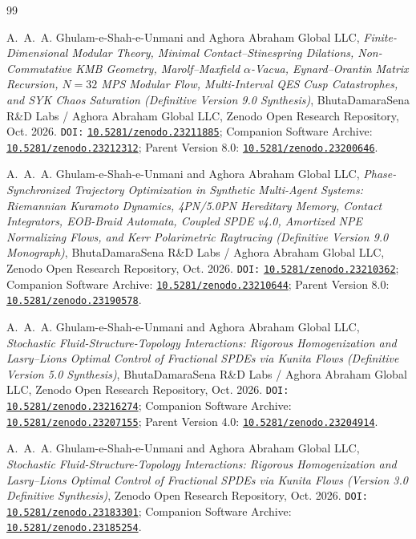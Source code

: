 \documentclass[11pt,a4paper,reqno]{article}
\newcommand{\zenodo}[1]{\href{https://doi.org/10.5281/zenodo.#1}{\nolinkurl{10.5281/zenodo.#1}}}
\theoremstyle{plain}
\theoremstyle{definition}
\theoremstyle{remark}
\numberwithin{equation}{section}
\begin{document}
\clearpage
\begin{thebibliography}{99}

A.~A.~A. Ghulam-e-Shah-e-Unmani and {Aghora Abraham Global LLC},
\emph{Finite-Dimensional Modular Theory, Minimal Contact--Stinespring Dilations, Non-Commutative KMB Geometry, Marolf--Maxfield $\alpha$-Vacua, Eynard--Orantin Matrix Recursion, $N=32$ MPS Modular Flow, Multi-Interval QES Cusp Catastrophes, and SYK Chaos Saturation (Definitive Version 9.0 Synthesis)},
BhutaDamaraSena R\&D Labs / Aghora Abraham Global LLC, Zenodo Open Research Repository, Oct. 2026.
\texttt{DOI:} \zenodo{23211885}; Companion Software Archive: \zenodo{23212312}; Parent Version 8.0: \zenodo{23200646}.

A.~A.~A. Ghulam-e-Shah-e-Unmani and {Aghora Abraham Global LLC},
\emph{Phase-Synchronized Trajectory Optimization in Synthetic Multi-Agent Systems: Riemannian Kuramoto Dynamics, 4PN/5.0PN Hereditary Memory, Contact Integrators, EOB-Braid Automata, Coupled SPDE v4.0, Amortized NPE Normalizing Flows, and Kerr Polarimetric Raytracing (Definitive Version 9.0 Monograph)},
BhutaDamaraSena R\&D Labs / Aghora Abraham Global LLC, Zenodo Open Research Repository, Oct. 2026.
\texttt{DOI:} \zenodo{23210362}; Companion Software Archive: \zenodo{23210644}; Parent Version 8.0: \zenodo{23190578}.

A.~A.~A. Ghulam-e-Shah-e-Unmani and {Aghora Abraham Global LLC},
\emph{Stochastic Fluid-Structure-Topology Interactions: Rigorous Homogenization and Lasry--Lions Optimal Control of Fractional SPDEs via Kunita Flows (Definitive Version 5.0 Synthesis)},
BhutaDamaraSena R\&D Labs / Aghora Abraham Global LLC, Zenodo Open Research Repository, Oct. 2026.
\texttt{DOI:} \zenodo{23216274}; Companion Software Archive: \zenodo{23207155}; Parent Version 4.0: \zenodo{23204914}.

A.~A.~A. Ghulam-e-Shah-e-Unmani and {Aghora Abraham Global LLC},
\emph{Stochastic Fluid-Structure-Topology Interactions: Rigorous Homogenization and Lasry--Lions Optimal Control of Fractional SPDEs via Kunita Flows (Version 3.0 Definitive Synthesis)},
Zenodo Open Research Repository, Oct. 2026.
\texttt{DOI:} \zenodo{23183301}; Companion Software Archive: \zenodo{23185254}.


\end{thebibliography}
\end{document}
